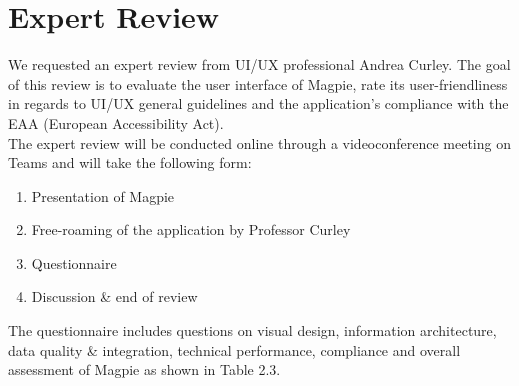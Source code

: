 \documentclass{report}
\begin{document}
\section{Expert Review}
We requested an expert review from UI/UX professional Andrea Curley. The goal of this review is to evaluate the user interface of Magpie, rate its user-friendliness in regards to UI/UX general guidelines and the application's compliance with the EAA (European Accessibility Act).\\
The expert review will be conducted online through a videoconference meeting on Teams and will take the following form:
\begin{enumerate}
    \item Presentation of Magpie
    \item Free-roaming of the application by Professor Curley
    \item Questionnaire
    \item Discussion \& end of review
\end{enumerate}
The questionnaire includes questions on visual design, information architecture, data quality \& integration, technical performance, compliance and overall assessment of Magpie as shown in Table 2.3.
\end{document}
